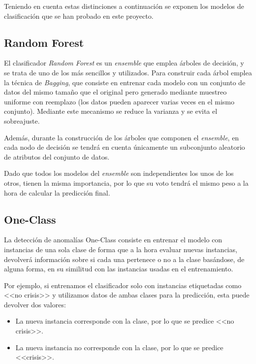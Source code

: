Teniendo en cuenta estas distinciones a continuación se exponen los modelos de clasificación que se han probado en este proyecto.

\subsection{Random Forest}

El clasificador \textit{Random Forest} es un \textit{ensemble} que emplea  árboles de decisión, y se trata de uno de los más sencillos y utilizados. Para construir cada árbol emplea la técnica de \textit{Bagging}, que consiste en entrenar cada modelo con un conjunto de datos del mismo tamaño que el original pero generado mediante muestreo uniforme con reemplazo (los datos pueden aparecer varias veces en el mismo conjunto). Mediante este mecanismo se reduce la varianza y se evita el sobreajuste. 

Además, durante la construcción de los árboles que componen el \textit{ensemble}, en cada nodo de decisión se tendrá en cuenta únicamente un subconjunto aleatorio de atributos del conjunto de datos.

Dado que todos los modelos del \textit{ensemble} son independientes los unos de los otros, tienen la misma importancia, por lo que su voto tendrá el mismo peso a la hora de calcular la predicción final. 

\subsection{One-Class}

La detección de anomalías One-Class consiste en entrenar el modelo con instancias de una sola clase de forma que a la hora evaluar nuevas instancias, devolverá información sobre si cada una pertenece o no a la clase basándose, de alguna forma, en su similitud con las instancias usadas en el entrenamiento. 

Por ejemplo, si entrenamos el clasificador solo con instancias etiquetadas como <<no crisis>> y utilizamos datos de ambas clases para la predicción, esta puede devolver dos valores: 

\begin{minipage}{\linewidth}
\begin{itemize}
	\item La nueva instancia corresponde con la clase, por lo que se predice <<no crisis>>. 
	\item La nueva instancia no corresponde con la clase, por lo que se predice <<crisis>>. 
\end{itemize}
\end{minipage}

